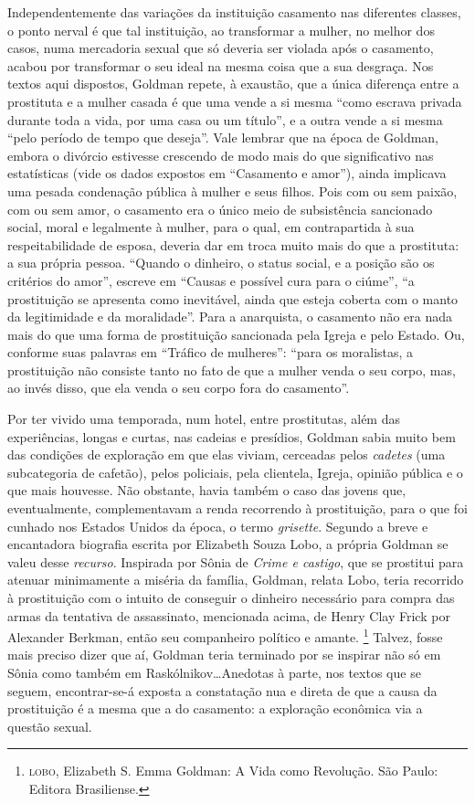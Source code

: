 Independentemente das variações da instituição casamento nas diferentes
classes, o ponto nerval é que tal instituição, ao transformar a mulher,
no melhor dos casos, numa mercadoria sexual que só deveria ser violada
após o casamento, acabou por transformar o seu ideal na mesma coisa que
a sua desgraça. Nos textos aqui dispostos, Goldman repete, à exaustão,
que a única diferença entre a prostituta e a mulher casada é que uma
vende a si mesma ``como escrava privada durante toda a vida, por uma
casa ou um título'', e a outra vende a si mesma ``pelo período de tempo
que deseja''. Vale lembrar que na época de Goldman, embora o divórcio
estivesse crescendo de modo mais do que significativo nas estatísticas
(vide os dados expostos em ``Casamento e amor''), ainda implicava uma
pesada condenação pública à mulher e seus filhos. Pois com ou sem
paixão, com ou sem amor, o casamento era o único meio de subsistência
sancionado social, moral e legalmente à mulher, para o qual, em
contrapartida à sua respeitabilidade de esposa, deveria dar em troca
muito mais do que a prostituta: a sua própria pessoa. ``Quando o
dinheiro, o status social, e a posição são os critérios do amor'',
escreve em ``Causas e possível cura para o ciúme'', ``a prostituição se
apresenta como inevitável, ainda que esteja coberta com o manto da
legitimidade e da moralidade''. Para a anarquista, o casamento não era
nada mais do que uma forma de prostituição sancionada pela Igreja e pelo
Estado. Ou, conforme suas palavras em ``Tráfico de mulheres'': ``para os
moralistas, a prostituição não consiste tanto no fato de que a mulher
venda o seu corpo, mas, ao invés disso, que ela venda o seu corpo fora
do casamento''.

Por ter vivido uma temporada, num hotel, entre prostitutas, além das
experiências, longas e curtas, nas cadeias e presídios, Goldman sabia
muito bem das condições de exploração em que elas viviam, cerceadas
pelos \textit{cadetes} (uma subcategoria de cafetão), pelos policiais, pela
clientela, Igreja, opinião pública e o que mais houvesse. Não obstante,
havia também o caso das jovens que, eventualmente, complementavam a
renda recorrendo à prostituição, para o que foi cunhado nos Estados
Unidos da época, o termo \textit{grisette}. Segundo a breve e encantadora
biografia escrita por Elizabeth Souza Lobo, a própria Goldman se valeu
desse \textit{recurso}. Inspirada por Sônia de \textit{Crime e castigo}, que se
prostitui para atenuar minimamente a miséria da família, Goldman, relata
Lobo, teria recorrido à prostituição com o intuito de conseguir o
dinheiro necessário para compra das armas da tentativa de assassinato,
mencionada acima, de Henry Clay Frick por Alexander Berkman, então seu
companheiro político e amante. \footnote{\textsc{lobo}, Elizabeth S. Emma
  Goldman: A Vida como Revolução. São Paulo: Editora Brasiliense.}
Talvez, fosse mais preciso dizer que aí, Goldman teria terminado por se
inspirar não só em Sônia como também em Raskólnikov\ldots Anedotas à parte,
nos textos que se seguem, encontrar-se-á exposta a constatação nua e
direta de que a causa da prostituição é a mesma que a do casamento: a
exploração econômica via a questão sexual.

